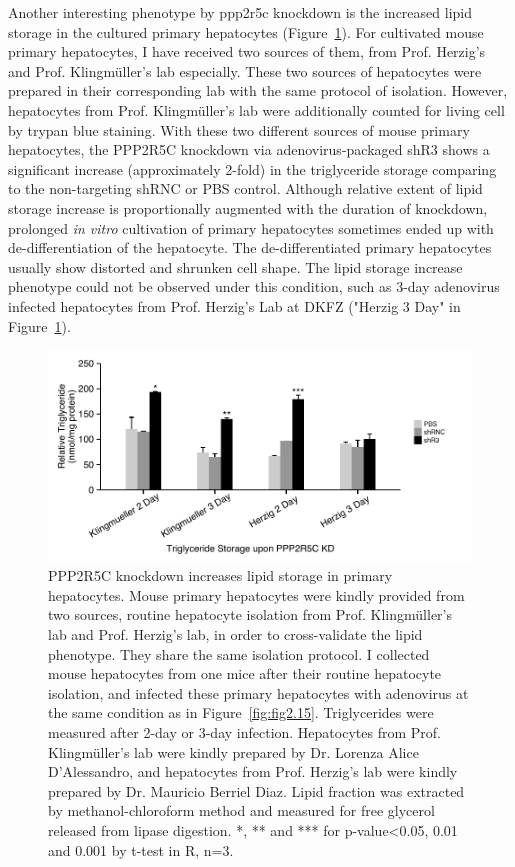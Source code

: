Another interesting phenotype by \gls{ppp2r5c} knockdown is the increased lipid storage in the cultured primary hepatocytes (Figure~\ref{fig:fig2.16}). For cultivated mouse primary hepatocytes, I have received two sources of them, from Prof. Herzig's and Prof. Klingm\"uller's lab especially. These two sources of hepatocytes were prepared in their corresponding lab with the same protocol of isolation. However, hepatocytes from Prof. Klingm\"uller's lab were additionally counted for living cell by trypan blue staining. With these two different sources of mouse primary hepatocytes, the PPP2R5C knockdown via adenovirus-packaged shR3 shows a significant increase (approximately 2-fold) in the triglyceride storage comparing to the non-targeting shRNC or PBS control. Although relative extent of lipid storage increase is proportionally augmented with the duration of knockdown, prolonged \textit{in vitro} cultivation of primary hepatocytes sometimes ended up with de-differentiation of the hepatocyte. The de-differentiated primary hepatocytes usually show distorted and shrunken cell shape. The lipid storage increase phenotype could not be observed under this condition, such as 3-day adenovirus infected hepatocytes from Prof. Herzig's Lab at DKFZ ("Herzig 3 Day" in Figure~\ref{fig:fig2.16}). 

\begin{figure}[!tb]
\centering
\includegraphics[width=1\textwidth]{figs/fig2-16 1st hepa tag.pdf}
\caption[Triglyceride in primary hepatocytes upon PPP2R5C KD]{\footnotesize PPP2R5C knockdown increases lipid storage in primary hepatocytes. Mouse primary hepatocytes were kindly provided from two sources, routine hepatocyte isolation from Prof. Klingm\"uller's lab and Prof. Herzig's lab, in order to cross-validate the lipid phenotype. They share the same isolation protocol. I collected mouse hepatocytes from one mice after their routine hepatocyte isolation, and infected these primary hepatocytes with adenovirus at the same condition as in Figure~\ref{fig:fig2.15}. Triglycerides were measured after 2-day or 3-day infection. Hepatocytes from Prof. Klingm\"uller's lab were kindly prepared by Dr. Lorenza Alice D'Alessandro, and hepatocytes from Prof. Herzig's lab were kindly prepared by Dr. Mauricio Berriel Diaz. Lipid fraction was extracted by methanol-chloroform method \cite{folch_simple_1957} and measured for free glycerol released from lipase digestion.  *, ** and *** for p-value<0.05, 0.01 and 0.001 by t-test in R, n=3.}
\label{fig:fig2.16}
\end{figure}

